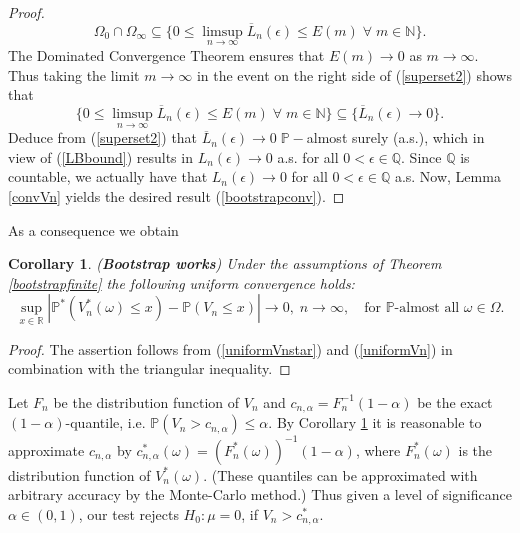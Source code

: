\documentclass[sn-mathphys,Numbered]{sn-jnl}%
\theoremstyle{thmstyleone}%
\theoremstyle{thmstyletwo}%
\newtheorem{corollary}{Corollary}%
\theoremstyle{thmstylethree}%
\begin{document}
\begin{proof}
\begin{equation}
 \Omega_0 \cap \Omega_\infty \subseteq \{ 0 \le \limsup_{n \rightarrow \infty} \overline{L}_n(\epsilon) \le E(m) \; \forall \; m \in \mathbb{N}\}.
\end{equation}
The Dominated Convergence Theorem ensures that $E(m) \rightarrow 0$ as $m \rightarrow \infty$. Thus taking the limit $m \rightarrow \infty$ in the event on the right side of (\ref{superset2}) shows that
$$
\{ 0 \le \limsup_{n \rightarrow \infty} \overline{L}_n(\epsilon) \le E(m) \; \forall \; m \in \mathbb{N}\} \subseteq \{\overline{L}_n(\epsilon) \rightarrow 0\}.
$$
Deduce from (\ref{superset2}) that $\overline{L}_n(\epsilon) \rightarrow 0 \; \mathbb{P}-$almost surely (a.s.), which in view of (\ref{LBbound}) results in
$L_n(\epsilon) \rightarrow 0$ a.s. for all $0<\epsilon \in \mathbb{Q}.$ Since $\mathbb{Q}$ is countable, we actually have
that $L_n(\epsilon) \rightarrow 0$ for all $0<\epsilon \in \mathbb{Q}$ a.s.
Now, Lemma \ref{convVn} yields the desired result (\ref{bootstrapconv}).
\end{proof}

As a consequence we obtain\\

\begin{corollary} \label{bootworks}(\textbf{Bootstrap works}) Under the assumptions of Theorem \ref{bootstrapfinite} the following uniform convergence holds:
$$
\sup_{x \in \mathbb{R}}|\mathbb{P}^*(V_n^*(\omega)\le x)-\mathbb{P}(V_n \le x)| \rightarrow 0,\; n \rightarrow \infty, \quad \text{for } \mathbb{P}\text{-almost all } \omega \in \Omega.
$$
\end{corollary}

\begin{proof}
The assertion follows from (\ref{uniformVnstar}) and (\ref{uniformVn}) in combination with the triangular inequality.
\end{proof}

Let $F_n$ be the distribution function of $V_n$ and $c_{n,\alpha}=F_n^{-1}(1-\alpha)$ be the exact $(1-\alpha)$-quantile, i.e.
$\mathbb{P}(V_n > c_{n,\alpha}) \le \alpha.$ By Corollary \ref{bootworks} it is reasonable to approximate $c_{n,\alpha}$ by
$c_{n,\alpha}^*(\omega) = (F_n^*(\omega))^{-1}(1-\alpha)$, where $F_n^*(\omega)$ is the distribution function of $V_n^*(\omega)$.
(These quantiles can be approximated with arbitrary accuracy by the Monte-Carlo method.) Thus given a level of significance $\alpha \in (0,1)$, our test rejects $H_0: \mu=0$, if
$V_n > c_{n,\alpha}^*$.\\
\end{document}
